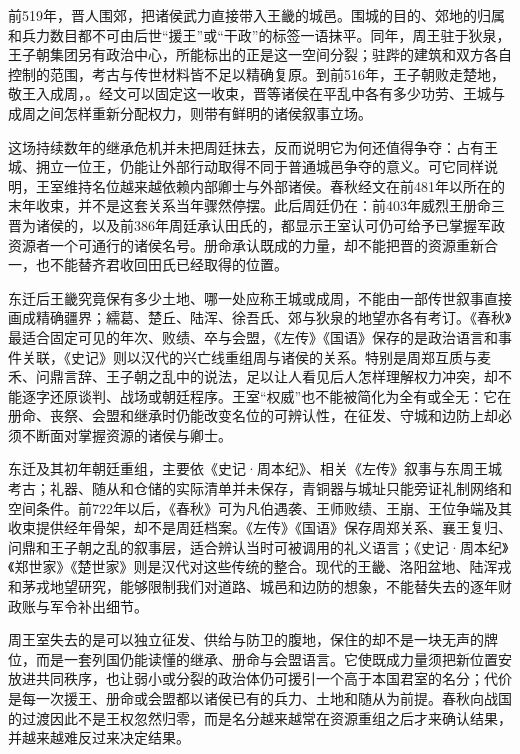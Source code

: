 前519年，晋人围郊，把诸侯武力直接带入王畿的城邑。围城的目的、郊地的归属和兵力数目都不可由后世“援王”或“干政”的标签一语抹平。同年，周王驻于狄泉，王子朝集团另有政治中心，所能标出的正是这一空间分裂；驻跸的建筑和双方各自控制的范围，考古与传世材料皆不足以精确复原。到前516年，王子朝败走楚地，敬王入成周，。经文可以固定这一收束，晋等诸侯在平乱中各有多少功劳、王城与成周之间怎样重新分配权力，则带有鲜明的诸侯叙事立场。

这场持续数年的继承危机并未把周廷抹去，反而说明它为何还值得争夺：占有王城、拥立一位王，仍能让外部行动取得不同于普通城邑争夺的意义。可它同样说明，王室维持名位越来越依赖内部卿士与外部诸侯。春秋经文在前481年以所在的末年收束，并不是这套关系当年骤然停摆。此后周廷仍在：前403年威烈王册命三晋为诸侯的，以及前386年周廷承认田氏的，都显示王室认可仍可给予已掌握军政资源者一个可通行的诸侯名号。册命承认既成的力量，却不能把晋的资源重新合一，也不能替齐君收回田氏已经取得的位置。

\begin{debate}
东迁后王畿究竟保有多少土地、哪一处应称王城或成周，不能由一部传世叙事直接画成精确疆界；繻葛、楚丘、陆浑、徐吾氏、郊与狄泉的地望亦各有考订。《春秋》最适合固定可见的年次、败绩、卒与会盟，《左传》《国语》保存的是政治语言和事件关联，《史记》则以汉代的兴亡线重组周与诸侯的关系。特别是周郑互质与麦禾、问鼎言辞、王子朝之乱中的说法，足以让人看见后人怎样理解权力冲突，却不能逐字还原谈判、战场或朝廷程序。王室“权威”也不能被简化为全有或全无：它在册命、丧祭、会盟和继承时仍能改变名位的可辨认性，在征发、守城和边防上却必须不断面对掌握资源的诸侯与卿士。
\end{debate}

\begin{sourcenote}
东迁及其初年朝廷重组，主要依《史记·周本纪》、相关《左传》叙事与东周王城考古；礼器、随从和仓储的实际清单并未保存，青铜器与城址只能旁证礼制网络和空间条件。前722年以后，《春秋》可为凡伯遇袭、王师败绩、王崩、王位争端及其收束提供经年骨架，却不是周廷档案。《左传》《国语》保存周郑关系、襄王复归、问鼎和王子朝之乱的叙事层，适合辨认当时可被调用的礼义语言；《史记·周本纪》《郑世家》《楚世家》则是汉代对这些传统的整合。现代的王畿、洛阳盆地、陆浑戎和茅戎地望研究，能够限制我们对道路、城邑和边防的想象，不能替失去的逐年财政账与军令补出细节。
\end{sourcenote}

\begin{turningpoint}
周王室失去的是可以独立征发、供给与防卫的腹地，保住的却不是一块无声的牌位，而是一套列国仍能读懂的继承、册命与会盟语言。它使既成力量须把新位置安放进共同秩序，也让弱小或分裂的政治体仍可援引一个高于本国君室的名分；代价是每一次援王、册命或会盟都以诸侯已有的兵力、土地和随从为前提。春秋向战国的过渡因此不是王权忽然归零，而是名分越来越常在资源重组之后才来确认结果，并越来越难反过来决定结果。
\end{turningpoint}


